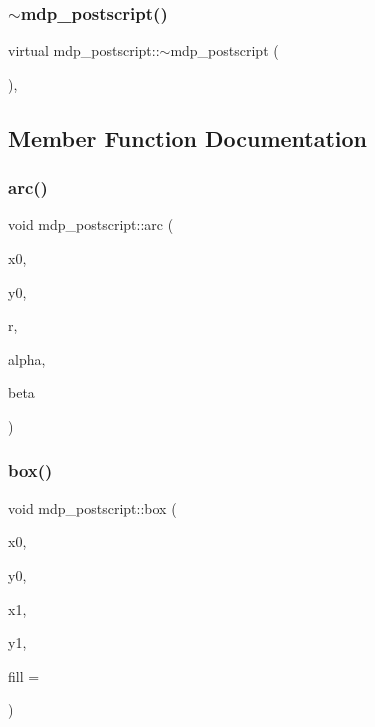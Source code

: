 \mbox{\label{classmdp__postscript_a3a46d2757dc2954f970987cb3bea2784}} 
\subsubsection{\texorpdfstring{$\sim$mdp\+\_\+postscript()}{~mdp\_postscript()}}
{\footnotesize\ttfamily virtual mdp\+\_\+postscript\+::$\sim$mdp\+\_\+postscript (\begin{DoxyParamCaption}{ }\end{DoxyParamCaption})\hspace{0.3cm}{\ttfamily [inline]}, {\ttfamily [virtual]}}



\subsection{Member Function Documentation}
\mbox{\label{classmdp__postscript_a56092f2141d3d1b0cc4afd333bed5e1e}} 
\subsubsection{\texorpdfstring{arc()}{arc()}}
{\footnotesize\ttfamily void mdp\+\_\+postscript\+::arc (\begin{DoxyParamCaption}\item[{float}]{x0,  }\item[{float}]{y0,  }\item[{float}]{r,  }\item[{float}]{alpha,  }\item[{float}]{beta }\end{DoxyParamCaption})\hspace{0.3cm}{\ttfamily [inline]}}

\mbox{\label{classmdp__postscript_aa44192cb071b678edb48adb39053a396}} 
\subsubsection{\texorpdfstring{box()}{box()}}
{\footnotesize\ttfamily void mdp\+\_\+postscript\+::box (\begin{DoxyParamCaption}\item[{float}]{x0,  }\item[{float}]{y0,  }\item[{float}]{x1,  }\item[{float}]{y1,  }\item[{int}]{fill = {} }\end{DoxyParamCaption})\hspace{0.3cm}{\ttfamily [inline]}}

